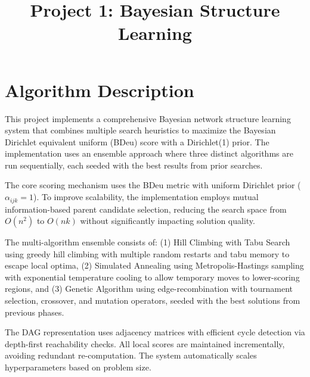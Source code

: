 \documentclass[twoside,11pt]{article}
\begin{document}
\title{Project 1: Bayesian Structure Learning}



\maketitle

\section{Algorithm Description}
This project implements a comprehensive Bayesian network structure learning system that combines multiple search heuristics to maximize the Bayesian Dirichlet equivalent uniform (BDeu) score with a Dirichlet(1) prior. The implementation uses an ensemble approach where three distinct algorithms are run sequentially, each seeded with the best results from prior searches.

The core scoring mechanism uses the BDeu metric with uniform Dirichlet prior ($\alpha_{ijk} = 1$). To improve scalability, the implementation employs mutual information-based parent candidate selection, reducing the search space from $O(n^2)$ to $O(nk)$ without significantly impacting solution quality.

The multi-algorithm ensemble consists of: (1) Hill Climbing with Tabu Search using greedy hill climbing with multiple random restarts and tabu memory to escape local optima, (2) Simulated Annealing using Metropolis-Hastings sampling with exponential temperature cooling to allow temporary moves to lower-scoring regions, and (3) Genetic Algorithm using edge-recombination with tournament selection, crossover, and mutation operators, seeded with the best solutions from previous phases.

The DAG representation uses adjacency matrices with efficient cycle detection via depth-first reachability checks. All local scores are maintained incrementally, avoiding redundant re-computation. The system automatically scales hyperparameters based on problem size.
\end{document}
